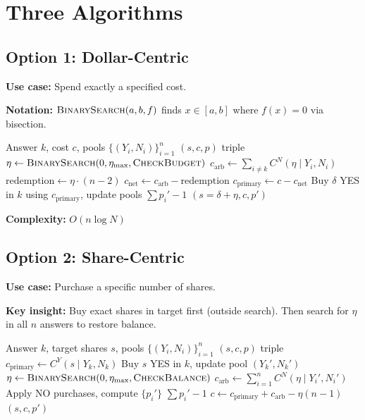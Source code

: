 \documentclass[11pt]{article}
\begin{document}
\section{Three Algorithms}
\label{sec:algorithms}

\subsection{Option 1: Dollar-Centric}

\textbf{Use case:} Spend exactly a specified cost.

\textbf{Notation:} $\textsc{BinarySearch}(a, b, f)$ finds $x \in [a, b]$ where $f(x) = 0$ via bisection.

\begin{algorithm}[H]
\caption{Dollar-Centric Purchase}
\label{alg:dollar-centric}
\begin{algorithmic}[1]
\Require Answer $k$, cost $c$, pools $\{(Y_i, N_i)\}_{i=1}^n$
\Ensure $(s, c, p)$ triple
\State $\eta \gets \textsc{BinarySearch}(0, \eta_{\max}, \textsc{CheckBudget})$
    \State $c_{\text{arb}} \gets \sum_{i \neq k} C^N(\eta \mid Y_i, N_i)$ 
    \State $\text{redemption} \gets \eta \cdot (n-2)$ 
    \State $c_{\text{net}} \gets c_{\text{arb}} - \text{redemption}$
    \State $c_{\text{primary}} \gets c - c_{\text{net}}$
    \State Buy $\delta$ YES in $k$ using $c_{\text{primary}}$, update pools
    \State \Return $\sum p_i' - 1$ 
\EndFunction
\State \Return $(s = \delta + \eta, c, p')$
\end{algorithmic}
\end{algorithm}

\textbf{Complexity:} $O(n \log N)$

\subsection{Option 2: Share-Centric}

\textbf{Use case:} Purchase a specific number of shares.

\textbf{Key insight:} Buy exact shares in target first (outside search). Then search for $\eta$ in all $n$ answers to restore balance.

\begin{algorithm}[H]
\caption{Share-Centric Purchase}
\label{alg:share-centric}
\begin{algorithmic}[1]
\Require Answer $k$, target shares $s$, pools $\{(Y_i, N_i)\}_{i=1}^n$
\Ensure $(s, c, p)$ triple
\State $c_{\text{primary}} \gets C^Y(s \mid Y_k, N_k)$
\State Buy $s$ YES in $k$, update pool $(Y_k', N_k')$
\State
\State $\eta \gets \textsc{BinarySearch}(0, \eta_{\max}, \textsc{CheckBalance})$
    \State $c_{\text{arb}} \gets \sum_{i=1}^n C^N(\eta \mid Y_i', N_i')$ 
    \State Apply NO purchases, compute $\{p_i'\}$
    \State \Return $\sum p_i' - 1$
\EndFunction
\State $c \gets c_{\text{primary}} + c_{\text{arb}} - \eta(n-1)$ 
\State \Return $(s, c, p')$
\end{algorithmic}
\end{algorithm}
\end{document}

